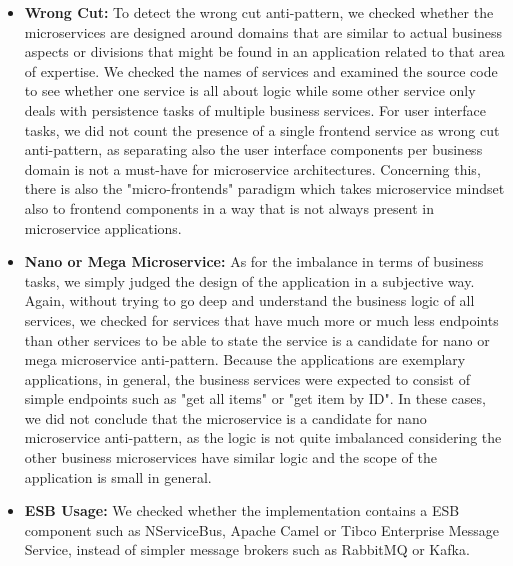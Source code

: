\documentclass{Configuration_Files/PoliMi3i_thesis}
\begin{document}
\begin{itemize}
\begin{itemize}
        \item \textbf{Wrong Cut:} To detect the wrong cut anti-pattern, we checked whether the microservices are designed around domains that are similar to actual business aspects or divisions that might be found in an application related to that area of expertise.
        We checked the names of services and examined the source code to see whether one service is all about logic while some other service only deals with persistence tasks of multiple business services.
        For user interface tasks, we did not count the presence of a single frontend service as wrong cut anti-pattern, as separating also the user interface components per business domain is not a must-have for microservice architectures.
        Concerning this, there is also the "micro-frontends"\footnotemark[62] paradigm which takes microservice mindset also to frontend components in a way that is not always present in microservice applications.
        
        \item \textbf{Nano or Mega Microservice:} As for the imbalance in terms of business tasks, we simply judged the design of the application in a subjective way.
        Again, without trying to go deep and understand the business logic of all services, we checked for services that have much more or much less endpoints than other services to be able to state the service is a candidate for nano or mega microservice anti-pattern.
        Because the applications are exemplary applications, in general, the business services were expected to consist of simple endpoints such as "get all items" or "get item by ID".
        In these cases, we did not conclude that the microservice is a candidate for nano microservice anti-pattern, as the logic is not quite imbalanced considering the other business microservices have similar logic and the scope of the application is small in general.
        
        \item \textbf{ESB Usage:} We checked whether the implementation contains a ESB component such as NServiceBus\footnotemark[63], Apache Camel\footnotemark[64] or Tibco Enterprise Message Service\footnotemark[65], instead of simpler message brokers such as RabbitMQ or Kafka.
        

\end{itemize}
\end{itemize}
\end{document}
